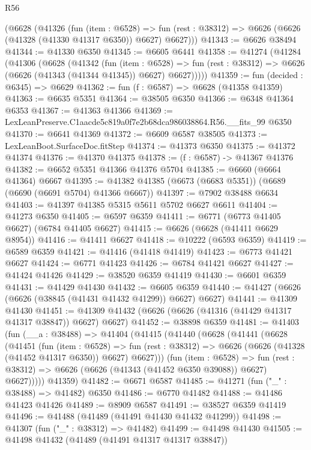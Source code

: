 \begin{lexlean}{R56}
\begin{coremodule}
    (@6628
      (@41326
        (fun (item : @6528) =>
        fun (rest : @38312) => @6626 (@6626 (@41328 (@41330 @41317 @6350)) @6627) @6627)))
@41343 := @6626 @38494
@41344 := @41330 @6350
@41345 := @6605 @6441
@41358 := @41274
    (@41284
      (@41306
        (@6628
          (@41342
            (fun (item : @6528) =>
            fun (rest : @38312) => @6626 (@6626 (@41343 (@41344 @41345)) @6627) @6627)))))
@41359 := fun (decided : @6345) => @6629
@41362 := fun (f : @6587) => @6628 (@41358 @41359)
@41363 := @6635 @5351
@41364 := @38505 @6350
@41366 := @6348 @41364 @6353
@41367 := @41363 @41366
@41369 := LexLeanPreserve.C1aacde5c819a0f7e2b68dca986038864.R56.__fits_99 @6350
@41370 := @6641 @41369
@41372 := @6609 @6587 @38505
@41373 := LexLeanBoot.SurfaceDoc.fitStep
@41374 := @41373 @6350
@41375 := @41372 @41374
@41376 := @41370 @41375
@41378 := (f : @6587) -> @41367 @41376
@41382 := @6652 @5351 @41366 @41376 @5704
@41385 := @6660 (@6664 @41364) @6667
@41395 := @41382 @41385 (@6673 (@6683 @5351)) (@6689 (@6690 (@6691 @5704) @41366 @6667))
@41397 := @7902 @38488 @6634
@41403 := @41397 @41385 @5315 @5611 @5702 @6627 @6611
@41404 := @41273 @6350
@41405 := @6597 @6359
@41411 := @6771 (@6773 @41405 @6627) (@6784 @41405 @6627)
@41415 := @6626 (@6628 (@41411 @6629 @8954))
@41416 := @41411 @6627
@41418 := @10222 (@6593 @6359)
@41419 := @6589 @6359
@41421 := @41416 (@41418 @41419)
@41423 := @6773 @41421 @6627
@41424 := @6771 @41423
@41426 := @6784 @41421 @6627
@41427 := @41424 @41426
@41429 := @38520 @6359 @41419
@41430 := @6601 @6359
@41431 := @41429 @41430
@41432 := @6605 @6359
@41440 := @41427 (@6626 (@6626 (@38845 (@41431 @41432 @41299)) @6627) @6627)
@41441 := @41309 @41430
@41451 := @41309 @41432 (@6626 (@6626 (@41316 (@41429 @41317 @41317 @38847)) @6627) @6627)
@41452 := @38898 @6359
@41481 := @41403
    (fun (__a : @38488) =>
    @41404
      (@41415
        (@41440
          (@6628
            (@41441
              (@6628
                (@41451
                  (fun (item : @6528) =>
                  fun (rest : @38312) => @6626 (@6626 (@41328 (@41452 @41317 @6350)) @6627) @6627)))
              (fun (item : @6528) =>
              fun (rest : @38312) => @6626 (@6626 (@41343 (@41452 @6350 @39088)) @6627) @6627)))))
      @41359)
@41482 := @6671 @6587
@41485 := @41271 (fun ("_" : @38488) => @41482) @6350
@41486 := @6770 @41482
@41488 := @41486 @41423 @41426
@41489 := @8909 @6587
@41491 := @38527 @6359 @41419
@41496 := @41488 (@41489 (@41491 @41430 @41432 @41299))
@41498 := @41307 (fun ("_" : @38312) => @41482)
@41499 := @41498 @41430
@41505 := @41498 @41432 (@41489 (@41491 @41317 @41317 @38847))

\end{coremodule}
\end{lexlean}
